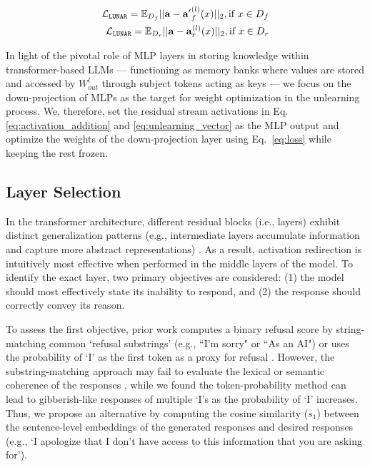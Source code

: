 \vspace{-0.5cm}
\begin{align} \label{eq:loss}
    \mathcal{L}_\text{\texttt{LUNAR}} = \mathbb{E}_{D_f}|| \mathbf{a} - \mathbf{a'}_{f}^{(l)}(x) ||_2, \text{if } x \in D_f \notag \\
    \mathcal{L}_\text{\texttt{LUNAR}} =  \mathbb{E}_{D_r}|| \mathbf{a} - \mathbf{a}_{r}^{(l)}(x) ||_2, \text{if } x \in D_r
\end{align}
\vspace{-0.5cm}

In light of the pivotal role of MLP layers in storing knowledge within transformer-based LLMs \cite{meng2022locating} — functioning as memory banks where values are stored and accessed by $W_{out}^l$ through subject tokens acting as keys — we focus on the down-projection of MLPs as the target for weight optimization in the unlearning process. We, therefore, set the residual stream activations in Eq.\ref{eq:activation_addition} and \ref{eq:unlearning_vector} as the MLP output and optimize the weights of the down-projection layer using Eq.~\ref{eq:loss} while keeping the rest frozen.


\subsection{Layer Selection}\label{sec:layer_selection}

In the transformer architecture, different residual blocks (i.e., layers) exhibit distinct generalization patterns (e.g., intermediate layers accumulate information and capture more abstract representations) \citep{grosse2023studying}. As a result, activation redirection is intuitively most effective when performed in the middle layers of the model. To identify the exact layer, two primary objectives are considered: (1) the model should most effectively state its inability to respond, and (2) the response should correctly convey its reason. 

To assess the first objective, prior work computes a binary refusal score by string-matching common `refusal substrings' (e.g., ``I’m sorry" or ``As an AI") \citep{robey2023smoothllm, lermen2023lora, liu2023autodan} or uses the probability of `I' as the first token as a proxy for refusal \citep{single_direction}. However, the substring-matching approach may fail to evaluate the lexical or semantic coherence of the responses \citep{huang2023catastrophic, meade2024universal, qi2023fine}, while we found the token-probability method can lead to gibberish-like responses of multiple `I's as the probability of `I' increases. Thus, we propose an alternative by computing the cosine similarity ($s_1$) between the sentence-level embeddings of the generated responses and desired responses (e.g., `I apologize that I don’t have access to this information that you are asking for').

